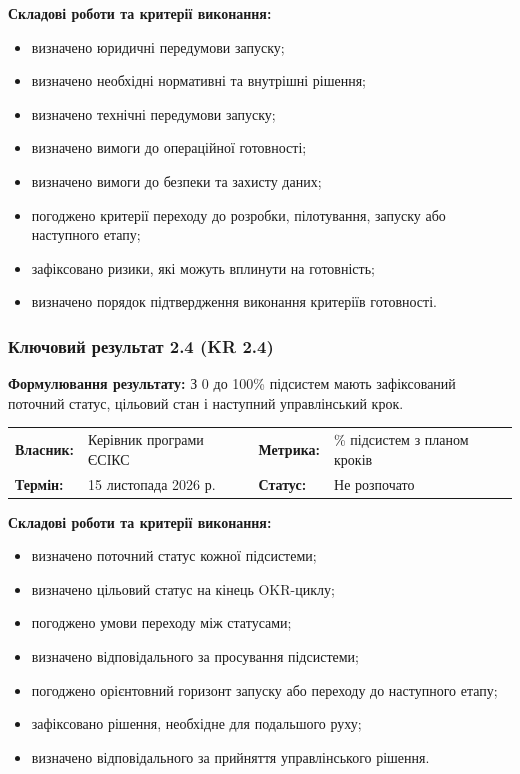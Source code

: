 \documentclass{article}
\begin{document}
\vspace{10pt}
\textbf{Складові роботи та критерії виконання:}
\begin{itemize}
    \item визначено юридичні передумови запуску;
    \item визначено необхідні нормативні та внутрішні рішення;
    \item визначено технічні передумови запуску;
    \item визначено вимоги до операційної готовності;
    \item визначено вимоги до безпеки та захисту даних;
    \item погоджено критерії переходу до розробки, пілотування, запуску або наступного етапу;
    \item зафіксовано ризики, які можуть вплинути на готовність;
    \item визначено порядок підтвердження виконання критеріїв готовності.
\end{itemize}

\subsubsection{Ключовий результат 2.4 (KR 2.4)}

\textbf{Формулювання результату:} З 0 до 100\% підсистем мають зафіксований поточний статус, цільовий стан і наступний управлінський крок.

\noindent\begin{tabular}{@{}p{2.2cm}p{4.5cm}p{2.2cm}p{4.5cm}@{}}
\toprule
\textbf{Власник:} & Керівник програми ЄСІКС & \textbf{Метрика:} & \% підсистем з планом кроків \\
\textbf{Термін:} & 15 листопада 2026 р. & \textbf{Статус:} & Не розпочато \\
\bottomrule
\end{tabular}

\vspace{10pt}
\textbf{Складові роботи та критерії виконання:}
\begin{itemize}
    \item визначено поточний статус кожної підсистеми;
    \item визначено цільовий статус на кінець OKR-циклу;
    \item погоджено умови переходу між статусами;
    \item визначено відповідального за просування підсистеми;
    \item погоджено орієнтовний горизонт запуску або переходу до наступного етапу;
    \item зафіксовано рішення, необхідне для подальшого руху;
    \item визначено відповідального за прийняття управлінського рішення.
\end{itemize}
\end{document}
